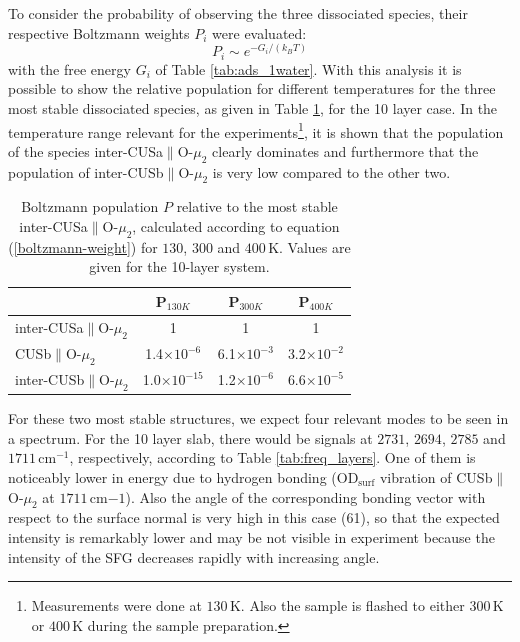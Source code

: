 \documentclass[11pt,DIV=13,BCOR=5mm,a4paper,headinclude]{scrbook}
\begin{document}
To consider the probability of observing the three dissociated species, their respective Boltzmann weights $P_i$ were evaluated:
\begin{equation}\label{boltzmann-weight}
 P_i\sim e^{-G_i/(k_BT)}
\end{equation}
with the free energy $G_i$ of Table \ref{tab:ads_1water}.
With this analysis it is possible to show the relative population for different temperatures for the three most stable dissociated species, as given in Table \ref{tab:boltzmann-pop}, for the 10 layer case.
In the temperature range relevant for the experiments\footnote{Measurements were done at $130\,$K. Also the sample is flashed to either $300\,$K or $400\,$K during the sample preparation.}, it is shown that the population of the species inter-CUSa$\parallel$O-$\mu_2$ clearly dominates and furthermore that the population of inter-CUSb$\parallel$O-$\mu_2$ is very low compared to the other two.
\begin{table}[th]
  \centering
 \caption{Boltzmann population $P$ relative to the most stable inter-CUSa$\parallel$O-$\mu_2$, calculated according to equation (\ref{boltzmann-weight}) for $130$, $300$ and $400\,$K.
Values are given for the 10-layer system.}
\vspace*{.2cm} 
 \begin{tabular}{l|ccc}
 \toprule
  & P$_{130K}$ & P$_{300K}$ & P$_{400K}$\\\midrule
  inter-CUSa$\parallel$O-$\mu_2$ &1 &1 &1 \\
  CUSb$\parallel$O-$\mu_2$ & 1.4$\times 10^{-6}$& 6.1$\times 10^{-3}$& 3.2$\times 10^{-2}$\\
  inter-CUSb$\parallel$O-$\mu_2$ & 1.0$\times 10^{-15}$ & 1.2$\times 10^{-6}$ & 6.6$\times 10^{-5}$\\\bottomrule
  \end{tabular} 
  \label{tab:boltzmann-pop}
\end{table}


For these two most stable structures, we expect four relevant modes to be seen in a spectrum.
For the 10 layer slab, there would be signals at $2731$, $2694$, $2785$ and $1711\,$cm$^{-1}$, respectively, according to Table \ref{tab:freq_layers}.
One of them is noticeably lower in energy due to hydrogen bonding (OD$_\textrm{surf}$ vibration of CUSb$\parallel$O-$\mu_2$ at $1711\,$cm${-1}$).
Also the angle of the corresponding bonding vector with respect to the surface normal is very high in this case (61\textdegree), so that the expected intensity is remarkably lower and may be not visible in experiment because the intensity of the SFG decreases rapidly with increasing angle\cite{Wirth2014}.
\end{document}
